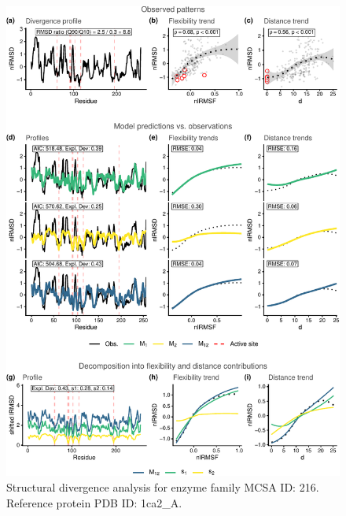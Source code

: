 \documentclass[
]{article}
\begin{document}
\clearpage
\begin{figure}[H]
\centering


\begin{center}\includegraphics{supplementary_material_files/figure-latex/generate_figures-11} \end{center}

\caption{Structural divergence analysis for enzyme family MCSA ID: 216. Reference protein PDB ID: 1ca2\_A.}
\end{figure}
\end{document}

